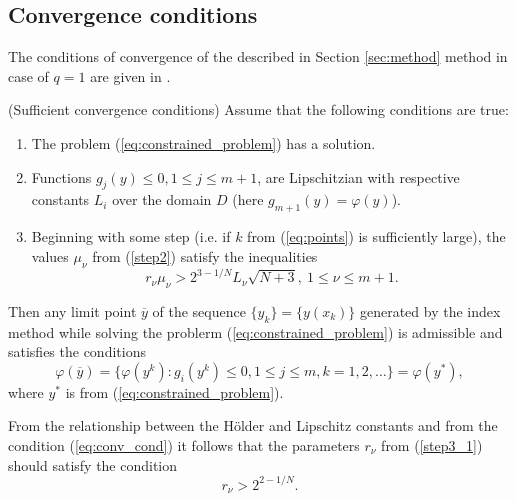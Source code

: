 \documentclass[runningheads]{llncs}
\begin{document}
\subsection{Convergence conditions }
\label{sec:conv_method}

The conditions of convergence of the described in Section \ref{sec:method} method in case of \(q=1\) are given in \cite{Strongin2000}.
\begin{theorem} (Sufficient convergence conditions)
  \label{th:single_conv}
  Assume that the following conditions are true:
  \begin{enumerate}
    \item The problem (\ref{eq:constrained_problem}) has a solution.
    \item Functions \(g_j(y)\leqslant 0, 1\leqslant j\leqslant m + 1\), are Lipschitzian with
respective constants \(L_i\) over the domain \(D\) (here \(g_{m+1}(y)=\varphi(y)\)).
    \item Beginning with some step (i.e. if \(k\) from (\ref{eq:points}) is sufficiently large),
    the values \(\mu_\nu\) from (\ref{step2}) satisfy the inequalities
    \begin{equation}
      r_\nu\mu_\nu > 2^{3-1/N}L_\nu \sqrt{N+3},\: 1\leqslant \nu \leqslant m + 1.
    \end{equation}
  \end{enumerate}
  Then any limit point \(\overline{y}\) of the sequence \(\{y_k\} = \{y(x_k)\}\) generated
  by the index method while solving the problerm
  (\ref{eq:constrained_problem}) is admissible and satisfies the conditions
\begin{equation}
  \label{eq:conv_cond}
  \varphi(\overline{y})=\{ \varphi(y^k): g_i(y^k)\leqslant 0,1\leqslant j\leqslant m, k=1,2,\dots\}=\varphi(y^*),
\end{equation}
  where \(y^*\) is from (\ref{eq:constrained_problem}).
\end{theorem}

\begin{remark}
  \label{rem:r1}
  From the relationship between the H\"{o}lder and Lipschitz constants and from the condition (\ref{eq:conv_cond}) it follows
  that the parameters \(r_\nu\) from (\ref{step3_1}) should satisfy the condition
  \begin{equation}
    r_\nu > 2^{2 - 1/N}.
  \end{equation}
\end{remark}
\end{document}

